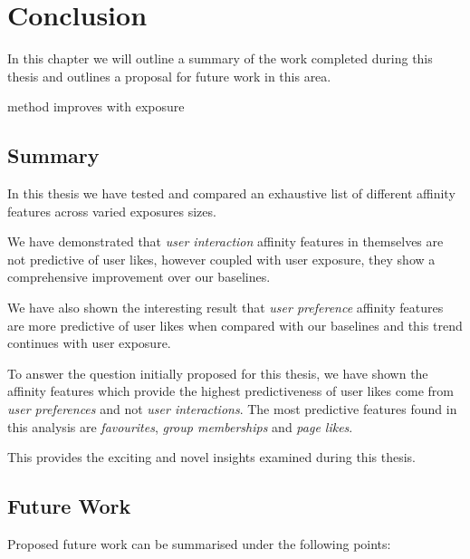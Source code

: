 
\chapter{Conclusion}
\label{cha:conc}

In this chapter we will outline a summary of the work completed during this thesis and outlines a proposal for future work in this area.

method improves with exposure

\section{Summary}
\label{sec:conc}

In this thesis we have tested and compared an exhaustive list of different affinity features across varied exposures sizes.

We have demonstrated that \emph{user interaction} affinity features in themselves are not predictive of user likes, however coupled with user 
exposure, they show a comprehensive improvement over our baselines.

We have also shown the interesting result that \emph{user preference} affinity features are more predictive of user likes when compared
with our baselines and this trend continues with user exposure.

To answer the question initially proposed for this thesis, we have shown the affinity features which provide the highest predictiveness of user likes come from \emph{user preferences} and not
\emph{user interactions}. The most predictive features found in this analysis are \emph{favourites}, \emph{group memberships} 
and \emph{page likes}.

This provides the exciting and novel insights examined during this thesis.

\section{Future Work}
\label{sec:ftw}

Proposed future work can be summarised under the following points:

